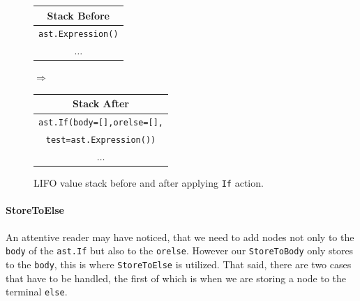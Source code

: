 \begin{figure}[H]\label{fig:if-stack}
  \centering
  {\small

  \begin{tabular}{|c|}
    \hline
    \textbf{Stack Before} \\ \hline
    \texttt{\tiny{ast.}}\texttt{Expression()}\\ \hline
    \(\dots\)             \\ \hline
  \end{tabular}
  \hspace{0.25em}$\Longrightarrow$\hspace{0.25em}
  \begin{tabular}{|c|}
    \hline
    \textbf{Stack After} \\ \hline
    \texttt{\tiny{ast.}}\texttt{If(body=[],orelse=[],}\\
    \texttt{test=}\texttt{\tiny{ast.}}\texttt{Expression())} \\ \hline
    \(\dots\)                       \\ \hline
  \end{tabular}
  }
  \caption{LIFO value stack before and after applying \texttt{If} action.}
  
\end{figure}

\paragraph{StoreToElse}
An attentive reader may have noticed, that we need to add nodes not only to the \texttt{body} of the \texttt{ast.If} but also to the \texttt{orelse}. However our \texttt{StoreToBody} only stores to the \texttt{body}, this is where \texttt{StoreToElse} is utilized. That said, there are two cases that have to be handled, the first of which is when we are storing a node to the terminal \texttt{else}.

